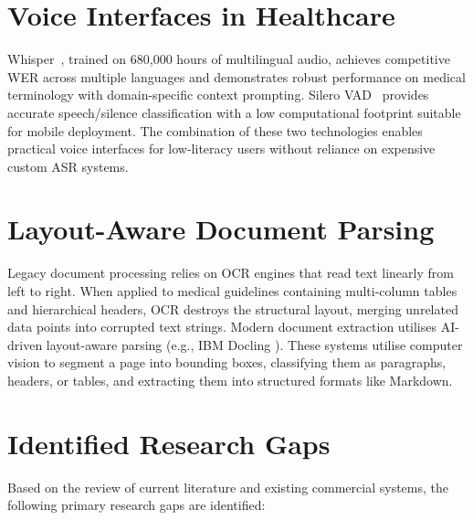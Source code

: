 \documentclass[12pt,a4paper]{report}
\begin{document}
\section{Voice Interfaces in Healthcare}

Whisper~\cite{Radford2023}, trained on 680,000 hours of multilingual audio, achieves competitive WER across multiple languages and demonstrates robust performance on medical terminology with domain-specific context prompting. Silero VAD~\cite{SileroTeam2021} provides accurate speech/silence classification with a low computational footprint suitable for mobile deployment. The combination of these two technologies enables practical voice interfaces for low-literacy users without reliance on expensive custom ASR systems.

\section{Layout-Aware Document Parsing}

Legacy document processing relies on OCR engines that read text linearly from left to right. When applied to medical guidelines containing multi-column tables and hierarchical headers, OCR destroys the structural layout, merging unrelated data points into corrupted text strings. Modern document extraction utilises AI-driven layout-aware parsing (e.g., IBM Docling \cite{IBMDocling2024}). These systems utilise computer vision to segment a page into bounding boxes, classifying them as paragraphs, headers, or tables, and extracting them into structured formats like Markdown.

\section{Identified Research Gaps}

Based on the review of current literature and existing commercial systems, the following primary research gaps are identified:
\end{document}
